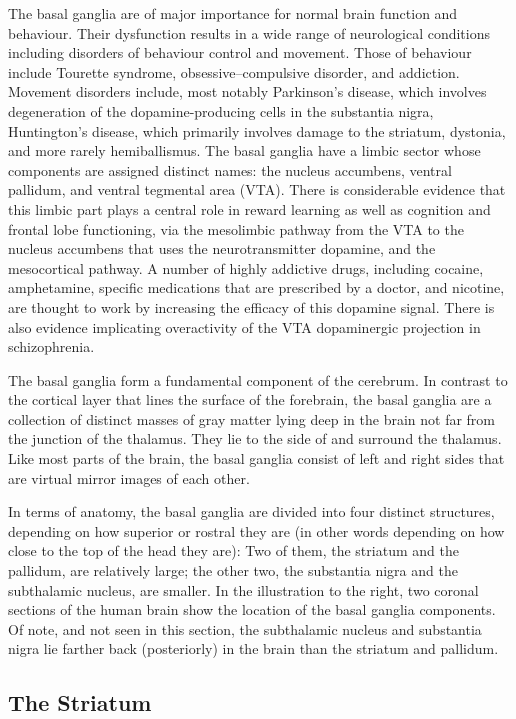 The basal ganglia are of major importance for normal brain function and behaviour. Their dysfunction results in a wide range of neurological conditions including disorders of behaviour control and movement. Those of behaviour include Tourette syndrome, obsessive--compulsive disorder, and addiction. Movement disorders include, most notably Parkinson's disease, which involves degeneration of the dopamine-producing cells in the substantia nigra, Huntington's disease, which primarily involves damage to the striatum, dystonia, and more rarely hemiballismus. The basal ganglia have a limbic sector whose components are assigned distinct names: the nucleus accumbens, ventral pallidum, and ventral tegmental area (VTA). There is considerable evidence that this limbic part plays a central role in reward learning as well as cognition and frontal lobe functioning, via the mesolimbic pathway from the VTA to the nucleus accumbens that uses the neurotransmitter dopamine, and the mesocortical pathway. A number of highly addictive drugs, including cocaine, amphetamine, specific medications that are prescribed by a doctor, and nicotine, are thought to work by increasing the efficacy of this dopamine signal. There is also evidence implicating overactivity of the VTA dopaminergic projection in schizophrenia.

The basal ganglia form a fundamental component of the cerebrum. In contrast to the cortical layer that lines the surface of the forebrain, the basal ganglia are a collection of distinct masses of gray matter lying deep in the brain not far from the junction of the thalamus. They lie to the side of and surround the thalamus. Like most parts of the brain, the basal ganglia consist of left and right sides that are virtual mirror images of each other.

In terms of anatomy, the basal ganglia are divided into four distinct structures, depending on how superior or rostral they are (in other words depending on how close to the top of the head they are): Two of them, the striatum and the pallidum, are relatively large; the other two, the substantia nigra and the subthalamic nucleus, are smaller. In the illustration to the right, two coronal sections of the human brain show the location of the basal ganglia components. Of note, and not seen in this section, the subthalamic nucleus and substantia nigra lie farther back (posteriorly) in the brain than the striatum and pallidum.

\hypertarget{the-striatum-1}{%
\subsection{The Striatum}\label{the-striatum-1}}

